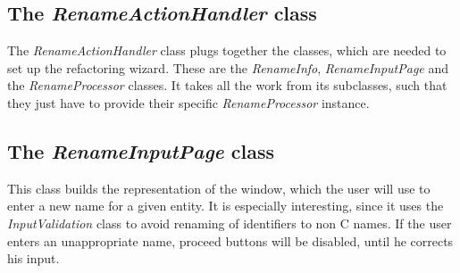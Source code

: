\documentclass[a4paper,10pt]{report}
\begin{document}
\subsection{The {\it RenameActionHandler} class}
The {\it RenameActionHandler} class plugs together the classes, which are needed to set up the refactoring wizard. These are the {\it RenameInfo}, {\it RenameInputPage} and the {\it RenameProcessor} classes.
It takes all the work from its subclasses, such that they just have to provide their specific {\it RenameProcessor} instance.

\subsection{The {\it RenameInputPage} class}
This class builds the representation of the window, which the user will use to enter a new name for a given entity.
It is especially interesting, since it uses the {\it InputValidation} class to avoid renaming of identifiers to non C names. If the user enters an unappropriate name, proceed buttons will be disabled, until he corrects his input.
\end{document}
